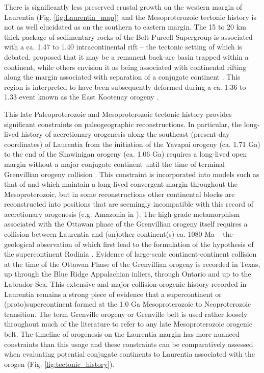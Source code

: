 \documentclass[11pt,letterpaper]{article}
\begin{document}
There is significantly less preserved crustal growth on the western margin of Laurentia (Fig. \ref{fig:Laurentia_map}) and the Mesoproterozoic tectonic history is not as well elucidated as on the southern to eastern margin. The 15 to 20 km thick package of sedimentary rocks of the Belt-Purcell Supergroup is associated with a ca. 1.47 to 1.40 intracontinental rift -- the tectonic setting of which is debated. \citet{Hoffman1989a} proposed that it may be a remanent back-arc basin trapped within a continent, while others envision it as being associated with continental rifting along the margin associated with separation of a conjugate continent \citep{Jones2015a}. This region is interpreted to have been subsequently deformed during a ca. 1.36 to 1.33 event known as the East Kootenay orogeny \citep{McMechan1982a, Nesheim2012a, McFarlane2015a}. 

This late Paleoproterozoic and Mesoproterozoic tectonic history provides significant constraints on paleogeographic reconstructions. In particular, the long-lived history of accretionary orogenesis along the southeast (present-day coordinates) of Laurentia from the initiation of the Yavapai orogeny (ca. 1.71 Ga) to the end of the Shawinigan orogeny (ca. 1.06 Ga) requires a long-lived open margin without a major conjugate continent until the time of terminal Grenvillian orogeny collision \citep{Karlstrom2001a}. This constraint is incorporated into models such as that of \citet{Zhang2012a} and \citet{Pehrsson2015a} which maintain a long-lived convergent margin throughout the Mesoproterozoic, but in some reconstructions other continental blocks are reconstructed into positions that are seemingly incompatible with this record of accretionary orogenesis (e.g. Amazonia in \citealp{Elming2009a}). The high-grade metamorphism associated with the Ottawan phase of the Grenvillian orogeny itself requires a collision between Laurentia and (an)other continent(s) ca. 1080 Ma -- the geological observation of which first lead to the formulation of the hypothesis of the supercontinent Rodinia \citep{Hoffman1991a}. Evidence of large-scale continent-continent collision at the time of the Ottawan Phase of the Grenvillian orogeny is recorded in Texas, up through the Blue Ridge Appalachian inliers, through Ontario and up to the Labrador Sea. This extensive and major collision orogenic history recorded in Laurentia remains a strong piece of evidence that a supercontinent or (proto)supercontinent formed at the 1.0 Ga Mesoproterozoic to Neoproterozoic transition. The term Grenville orogeny or Grenville belt is used rather loosely throughout much of the literature to refer to any late Mesoproterozoic orogenic belt. The timeline of orogenesis on the Laurentia margin has more nuanced constraints than this usage and these constraints can be comparatively assessed when evaluating potential conjugate continents to Laurentia associated with the orogen (Fig. \ref{fig:tectonic_history}).
\end{document}

